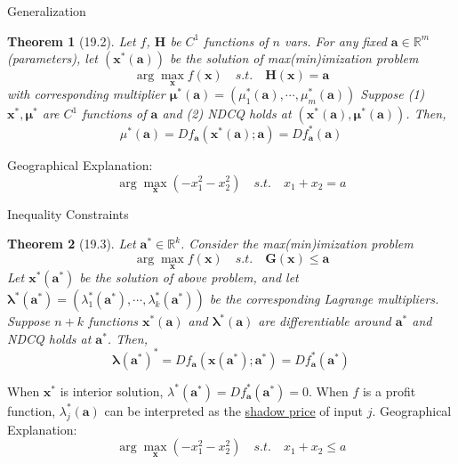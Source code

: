 \documentclass[a4paper,11pt]{article}
\newtheorem{thm}{Theorem}
\newcommand{\bb}{\mathbb}
\newcommand{\bd}{\mathbf}
\begin{document}
\begin{frame}[t]{Generalization}
	\begin{thm}
		[19.2] Let $f$, $\bd{H}$ be $C^1$ functions of $n$ vars. For any fixed $\bd{a}\in\bb{R}^m$ (parameters), let $(\bd{x}^\ast(\bd{a}))$ be the solution of max(min)imization problem \[
			\arg\max_{\bd{x}} f(\bd{x})\quad s.t.\quad \bd{H}(\bd{x})=\bd{a}
		\] with corresponding multiplier $\bd{\mu}^\ast(\bd{a})=(\mu_1^\ast(\bd{a}),\cdots,\mu_m^\ast(\bd{a}))$
		Suppose (1) $\bd{x}^\ast, \bd{\mu}^\ast$ are $C^1$ functions of $\bd{a}$ and (2) NDCQ holds at $(\bd{x^\ast}(\bd{a}),\bd{\mu}^\ast(\bd{a}))$. Then, \[
			\mu^\ast(\bd{a}) = D f_{\bd{a}}(\bd{x}^\ast(\bd{a});\bd{a})
			= Df_{\bd{a}}^\ast (\bd{a})
		\]
	\end{thm}
	Geographical Explanation: \[
		\arg\max_{\bd{x}} (-x_1^2 - x_2^2) \quad s.t. \quad x_1 + x_2 = a
	\]
\end{frame}


\begin{frame}[t]{Inequality Constraints}
	\begin{thm}
		[19.3] Let $\bd{a}^\ast\in\bb{R}^k$. Consider the max(min)imization problem\[
			\arg\max_{\bd{x}}f(\bd{x}) \quad s.t.\quad \bd{G}(\bd{x})\le \bd{a}
		\]
		Let $\bd{x}^\ast(\bd{a}^\ast)$ be the solution of above problem, and let $\bd{\lambda}^\ast(\bd{a}^\ast)=(\lambda_1^\ast(\bd{a}^\ast),\cdots,\lambda_k^\ast(\bd{a}^\ast))$ be the corresponding Lagrange multipliers. Suppose $n+k$ functions $\bd{x}^\ast(\bd{a})$ and  $\bd{\lambda}^\ast(\bd{a})$ are differentiable around $\bd{a}^\ast$ and NDCQ holds at $\bd{a}^\ast$. Then, \[
			\bd{\lambda({\bd{a}^\ast})^\ast} = Df_{\bd{a}}(\bd{x}(\bd{a}^\ast);\bd{a}^\ast)=Df_{\bd{a}}^\ast(\bd{a}^\ast)
		\]
	\end{thm}
	When $\bd{x}^\ast$ is interior solution, $\lambda^\ast(\bd{a^\ast})=Df_{\bd{a}}^\ast(\bd{a^\ast})=0$. When $f$ is a profit function, $\lambda_j^\ast(\bd{a})$ can be interpreted as the \uline{shadow price} of input $j$. Geographical Explanation: \[
		\arg\max_{\bd{x}} (-x_1^2 - x_2^2) \quad s.t. \quad x_1 + x_2 \le  a
	\]
\end{frame}
\end{document}
